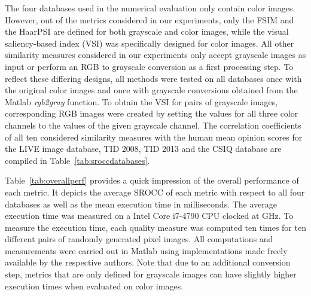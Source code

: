 \documentclass[11pt,a4paper]{article}
\begin{document}
The four databases used in the numerical evaluation only contain color images. However, out of the metrics considered in our experiments, only the FSIM and the HaarPSI are defined for both grayscale and color images, while the visual saliency-based index (VSI) was specifically designed for color images. All other similarity measures considered in our experiments only accept grayscale images as input or perform an RGB to grayscale conversion as a first processing step. To reflect these differing designs, all methods were tested on all databases once with the original color images and once with grayscale conversions obtained from the Matlab \textit{rgb2gray} function. To obtain the VSI for pairs of grayscale images, corresponding RGB images were created by setting the values for all three color channels to the values of the given grayscale channel. The correlation coefficients of all ten considered similarity measures with the human mean opinion scores for the LIVE image database, TID 2008, TID 2013 and the CSIQ database are compiled in Table~\ref{tab:sroccdatabases}.

Table~\ref{tab:overallperf} provides a quick impression of the overall performance of each metric. It depicts the average SROCC of each metric with respect to all four databases as well as the mean execution time in milliseconds. The average execution time was measured on a Intel Core i7-4790 CPU clocked at  GHz. To measure the execution time, each quality measure was computed ten times for ten different pairs of randomly generated  pixel images. All computations and measurements were carried out in Matlab using implementations made freely available by the respective authors. Note that due to an additional conversion step, metrics that are only defined for grayscale images can have slightly higher execution times when evaluated on color images.
\end{document}
